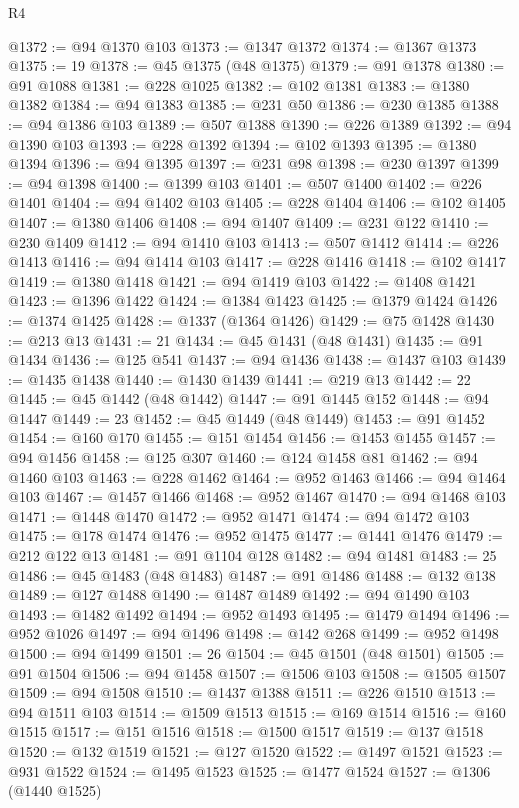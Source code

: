 \begin{lexlean}{R4}
\begin{coremodule}
@1372 := @94 @1370 @103
@1373 := @1347 @1372
@1374 := @1367 @1373
@1375 := 19
@1378 := @45 @1375 (@48 @1375)
@1379 := @91 @1378
@1380 := @91 @1088
@1381 := @228 @1025
@1382 := @102 @1381
@1383 := @1380 @1382
@1384 := @94 @1383
@1385 := @231 @50
@1386 := @230 @1385
@1388 := @94 @1386 @103
@1389 := @507 @1388
@1390 := @226 @1389
@1392 := @94 @1390 @103
@1393 := @228 @1392
@1394 := @102 @1393
@1395 := @1380 @1394
@1396 := @94 @1395
@1397 := @231 @98
@1398 := @230 @1397
@1399 := @94 @1398
@1400 := @1399 @103
@1401 := @507 @1400
@1402 := @226 @1401
@1404 := @94 @1402 @103
@1405 := @228 @1404
@1406 := @102 @1405
@1407 := @1380 @1406
@1408 := @94 @1407
@1409 := @231 @122
@1410 := @230 @1409
@1412 := @94 @1410 @103
@1413 := @507 @1412
@1414 := @226 @1413
@1416 := @94 @1414 @103
@1417 := @228 @1416
@1418 := @102 @1417
@1419 := @1380 @1418
@1421 := @94 @1419 @103
@1422 := @1408 @1421
@1423 := @1396 @1422
@1424 := @1384 @1423
@1425 := @1379 @1424
@1426 := @1374 @1425
@1428 := @1337 (@1364 @1426)
@1429 := @75 @1428
@1430 := @213 @13
@1431 := 21
@1434 := @45 @1431 (@48 @1431)
@1435 := @91 @1434
@1436 := @125 @541
@1437 := @94 @1436
@1438 := @1437 @103
@1439 := @1435 @1438
@1440 := @1430 @1439
@1441 := @219 @13
@1442 := 22
@1445 := @45 @1442 (@48 @1442)
@1447 := @91 @1445 @152
@1448 := @94 @1447
@1449 := 23
@1452 := @45 @1449 (@48 @1449)
@1453 := @91 @1452
@1454 := @160 @170
@1455 := @151 @1454
@1456 := @1453 @1455
@1457 := @94 @1456
@1458 := @125 @307
@1460 := @124 @1458 @81
@1462 := @94 @1460 @103
@1463 := @228 @1462
@1464 := @952 @1463
@1466 := @94 @1464 @103
@1467 := @1457 @1466
@1468 := @952 @1467
@1470 := @94 @1468 @103
@1471 := @1448 @1470
@1472 := @952 @1471
@1474 := @94 @1472 @103
@1475 := @178 @1474
@1476 := @952 @1475
@1477 := @1441 @1476
@1479 := @212 @122 @13
@1481 := @91 @1104 @128
@1482 := @94 @1481
@1483 := 25
@1486 := @45 @1483 (@48 @1483)
@1487 := @91 @1486
@1488 := @132 @138
@1489 := @127 @1488
@1490 := @1487 @1489
@1492 := @94 @1490 @103
@1493 := @1482 @1492
@1494 := @952 @1493
@1495 := @1479 @1494
@1496 := @952 @1026
@1497 := @94 @1496
@1498 := @142 @268
@1499 := @952 @1498
@1500 := @94 @1499
@1501 := 26
@1504 := @45 @1501 (@48 @1501)
@1505 := @91 @1504
@1506 := @94 @1458
@1507 := @1506 @103
@1508 := @1505 @1507
@1509 := @94 @1508
@1510 := @1437 @1388
@1511 := @226 @1510
@1513 := @94 @1511 @103
@1514 := @1509 @1513
@1515 := @169 @1514
@1516 := @160 @1515
@1517 := @151 @1516
@1518 := @1500 @1517
@1519 := @137 @1518
@1520 := @132 @1519
@1521 := @127 @1520
@1522 := @1497 @1521
@1523 := @931 @1522
@1524 := @1495 @1523
@1525 := @1477 @1524
@1527 := @1306 (@1440 @1525)

\end{coremodule}
\end{lexlean}
